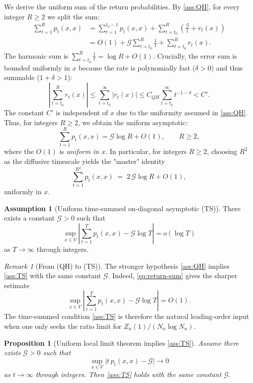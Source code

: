 \documentclass[reqno]{amsart}
\numberwithin{equation}{section}
\newtheorem{proposition}[proposition]{Proposition}
\theoremstyle{definition}
\newtheorem{assumption}[assumption]{Assumption}
\theoremstyle{remark}
\newtheorem{remark}[remark]{Remark}
\newcommand{\Cref}[1]{\autoref{#1}}
\newcommand{\cG}{\mathcal{G}}
\begin{document}
We derive the uniform sum of the return probabilities. By \Cref{ass:QH}, for every integer $R\ge 2$ we split the sum:
\begin{align*}
\sum_{t=1}^{R} p_t(x,x) &= \sum_{t=1}^{t_0-1} p_t(x,x) + \sum_{t=t_0}^{R} \left(\frac{\cG}{t} + r_t(x)\right) \\
&= O(1) + \cG \sum_{t=t_0}^{R} \frac{1}{t} + \sum_{t=t_0}^{R} r_t(x).
\end{align*}
The harmonic sum is $\sum_{t=t_0}^{R} \frac{1}{t} = \log R + O(1)$.
Crucially, the error sum is bounded uniformly in $x$ because the rate is polynomially fast ($\delta>0$) and thus summable ($1+\delta > 1$):
\[
\left|\sum_{t=t_0}^{R} r_t(x)\right| \leq \sum_{t=t_0}^{\infty} |r_t(x)| \leq C_{QH} \sum_{t=t_0}^{\infty} t^{-1-\delta} < C'.
\]
The constant $C'$ is independent of $x$ due to the uniformity assumed in \Cref{ass:QH}.
Thus, for integers $R\ge 2$, we obtain the uniform asymptotic:
\begin{equation}\label{eq:return-sum}
\sum_{t=1}^{R} p_t(x,x) = \cG \log R + O(1), \qquad R \geq 2,
\end{equation}
where the $O(1)$ is \emph{uniform in $x$}. In particular, for integers $R\ge 2$, choosing $R^2$ as the diffusive timescale yields the "master" identity
\begin{equation}\label{eq:master-sum}
  \sum_{t=1}^{R^{2}} p_t(x,x)
  \;=\; 2\,\cG \log R + O(1),
\end{equation}
uniformly in $x$.

\begin{assumption}[Uniform time-summed on-diagonal asymptotic (TS)]\label{ass:TS}
There exists a constant $\cG>0$ such that
\[
  \sup_{x\in V}\left|\sum_{t=1}^{T} p_t(x,x)-\cG \log T\right|=o(\log T)
\]
as $T\to\infty$ through integers.
\end{assumption}

\begin{remark}[From (QH) to (TS)]\label{rem:QH_implies_TS}
The stronger hypothesis \Cref{ass:QH} implies \Cref{ass:TS} with the same constant $\cG$. Indeed, \eqref{eq:return-sum} gives the sharper estimate
\[
  \sup_{x\in V}\left|\sum_{t=1}^{T} p_t(x,x)-\cG \log T\right|=O(1).
\]
The time-summed condition \Cref{ass:TS} is therefore the natural leading-order input when one only seeks the ratio limit for $Z_n(1)/(N_n\log N_n)$.
\end{remark}

\begin{proposition}[Uniform local limit theorem implies \Cref{ass:TS}]\label{prop:ullt_TS}
Assume there exists $\cG>0$ such that
\[
  \sup_{x\in V}\bigl|t\,p_t(x,x)-\cG\bigr|\longrightarrow 0
\]
as $t\to\infty$ through integers. Then \Cref{ass:TS} holds with the same constant $\cG$.
\end{proposition}
\end{document}
